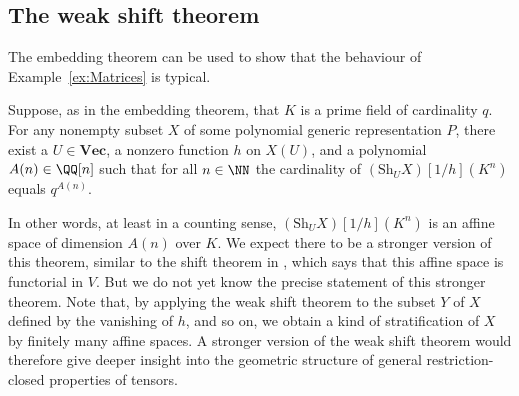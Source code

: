 \documentclass{amsart}
\renewcommand{\Vec}{\mathbf{Vec}}
\newcommand{\Sh}{\mathrm{Sh}}
\begin{document}
\subsection{The weak shift theorem}

The embedding theorem can be used to show that the behaviour of
Example~\ref{ex:Matrices} is typical.

\begin{cor} \label{cor:Shift}
Suppose, as in the embedding theorem, that $K$ is a prime field of
cardinality $q$.  For any nonempty subset $X$ of some  polynomial 
generic representation $P$, there exist a $U \in \Vec$, a nonzero
function $h$ on $X(U)$, and a polynomial $A(n) \in \QQ[n]$ such that
for all $n \in \NN$ the cardinality of $(\Sh_U X)[1/h](K^n)$ equals
$q^{A(n)}$.
\end{cor}

In other words, at least in a counting sense, $(\Sh_U X)[1/h](K^n)$
is an affine space of dimension $A(n)$ over $K$. We expect there to
be a stronger version of this theorem, similar to the shift theorem in
\cite{Bik21}, which says that this affine space is functorial in $V$. But
we do not yet know the precise statement of this stronger theorem. Note
that, by applying the weak shift theorem to the subset $Y$ of $X$ defined
by the vanishing of $h$, and so on, we obtain a kind of stratification
of $X$ by finitely many affine spaces. A stronger version of the weak
shift theorem would therefore give deeper insight into the geometric
structure of general restriction-closed properties of tensors.
\end{document}
